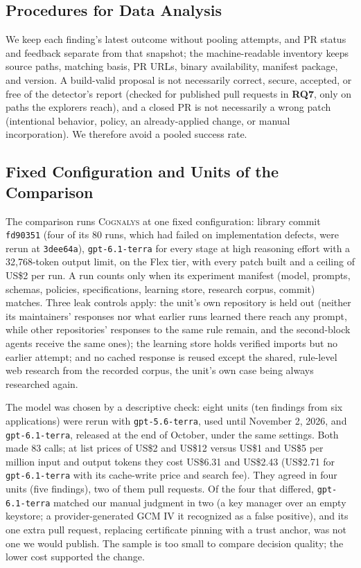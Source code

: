 \documentclass[conference]{IEEEtran}
\newcommand{\system}{\textsc{Cognalys}}
\newcommand{\researchq}[1]{\textbf{RQ#1}}
\begin{document}
\subsection{Procedures for Data Analysis}
\label{subsec:analysis}

We keep each finding's latest outcome without pooling attempts, and PR status
and feedback separate from that snapshot; the machine-readable inventory keeps
source paths, matching basis, PR URLs, binary availability, manifest package,
and version. A build-valid proposal is not necessarily correct, secure,
accepted, or free of the detector's report (checked for published pull
requests in \researchq{7}, only on paths the explorers reach), and a closed
PR is not necessarily a wrong patch (intentional behavior, policy, an
already-applied change, or manual incorporation). We therefore avoid a pooled
success rate.

\subsection{Fixed Configuration and Units of the Comparison}
\label{subsec:frozen}

The comparison runs {\system} at one fixed configuration: library commit
\texttt{fd90351} (four of its 80 runs, which had failed on implementation
defects, were rerun at \texttt{3dee64a}), \texttt{gpt-6.1-terra} for every stage at high reasoning
effort with a 32,768-token output limit, on the Flex tier, with every patch
built and a ceiling of US\$2 per run. A run counts only when its experiment
manifest (model, prompts, schemas, policies, specifications, learning store,
research corpus, commit) matches. Three leak controls apply: the unit's own
repository is held out (neither its maintainers' responses nor what earlier
runs learned there reach any prompt, while other repositories' responses to
the same rule remain, and the second-block agents receive the same ones); the
learning store holds verified imports but no earlier attempt; and no cached
response is reused except the shared, rule-level web research from the
recorded corpus, the unit's own case being always researched again.

The model was chosen by a descriptive check: eight units (ten findings from
six applications) were rerun with \texttt{gpt-5.6-terra}, used until
November 2, 2026, and \texttt{gpt-6.1-terra}, released at the end of October,
under the same settings. Both made 83 calls; at list prices of US\$2 and
US\$12 versus US\$1 and US\$5 per million input and output tokens they cost
US\$6.31 and US\$2.43 (US\$2.71 for \texttt{gpt-6.1-terra} with its
cache-write price and search fee). They agreed in four units (five findings),
two of them pull requests. Of the four that differed, \texttt{gpt-6.1-terra}
matched our manual judgment in two (a key manager over an empty keystore; a
provider-generated GCM IV it recognized as a false positive), and its one
extra pull request, replacing certificate pinning with a trust anchor, was not
one we would publish. The sample is too small to compare decision quality;
the lower cost supported the change.
\end{document}
